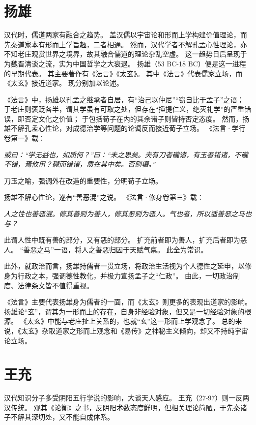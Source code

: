 \documentclass[11pt]{article}
\begin{document}
\section{扬雄}
汉代时，儒道两家有融合之趋势。
盖汉儒以宇宙论和形而上学构建价值理论，而先秦道家本有形而上学旨趣，二者相通。
然而，汉代学者不解孔孟心性理论，亦不知老庄观赏世界之境界，故其融合儒道的理论杂乱空虚。
这一趋势日后呈现于为魏晋清谈之流，实为中国哲学之大衰退。
扬雄（53 BC-18 BC）便是这一进程的早期代表。
其主要著作有《法言》《太玄》。
其中《法言》代表儒家立场，而《太玄》接近道家。
现分别加以论述。

\par

《法言》中，扬雄以孔孟之继承者自居，有“治己以仲尼”“窃自比于孟子”之语；
于老庄则褒贬各半，谓其学虽有可取之处，但存在“捶提仁义，绝灭礼学”的严重错误，即否定文化之价值；
于包括荀子在内的其余诸子则皆持否定态度。
然而，扬雄不解孔孟心性论，对成德治学等问题的论调反而接近荀子立场。
《法言·学行卷第一》载：

\textit{或曰：“学无益也，如质何？”曰：“未之思矣。夫有刀者礲诸，有玉者错诸，不礲不错，焉攸用？礲而错诸，质在其中矣。否则辍。”}

刀玉之喻，强调外在改造的重要性，分明荀子立场。

\par

扬雄不解心性论，遂有“善恶混”之说。
《法言·修身卷第三》载：

\textit{人之性也善恶混。修其善则为善人，修其恶则为恶人。气也者，所以适善恶之马也与？}

此谓人性中既有善的部分，又有恶的部分。
扩充前者即为善人，扩充后者即为恶人。
“善恶之马”一语，将人之善恶归因于天赋气禀。
此全为常识。

\par

此外，就政治而言，扬雄持儒者一贯立场，将政治生活视为个人德性之延申，以修身为行政之本，强调德性教化，并极力宣扬孟子之“仁政”。
由此，一切政治制度、法律条文皆不值得重视。

\par

《法言》主要代表扬雄身为儒者的一面，而《太玄》则更多的表现出道家的影响。
扬雄论“玄”，谓其为一形而上的存在，自身非经验对象，但又是一切经验对象的根源。
《太玄》中能与老庄扯上关系的，也就“玄”这一形而上学观念了。
总的来说，《太玄》杂取道家之形而上观念和《易传》之神秘主义倾向，却又不持纯宇宙论立场。

\section{王充}
汉代知识分子多受阴阳五行学说的影响，大谈天人感应。
王充（27-97）则一反两汉传统。
观其《论衡》之书，反阴阳术数态度鲜明，但相关理论简陋，于先秦诸子不解其深切处，又不能自成体系。
\end{document}
